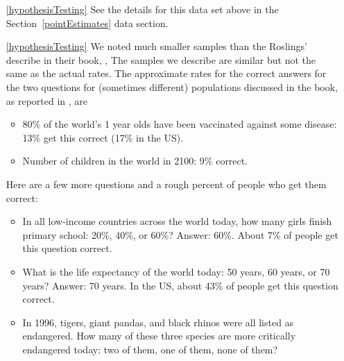 \begin{itemize}
\item[\ref{hypothesisTesting}]
    See the details for this data set above
    in the Section~\ref{pointEstimates} data section.
\item[\ref{hypothesisTesting}]
    We noted much smaller samples than the Roslings'
    describe in their book,
    ,
    The samples we describe are similar but not
    the same as the actual rates.
    The approximate rates for the correct answers for the
    two questions for (sometimes different) populations
    discussed in the book, as reported in
    ,
    are
    \begin{itemize}
    \item
        80\% of the world's 1 year olds have been vaccinated
        against some disease:
        13\% get this correct (17\% in the US).
    \item
        Number of children in the world in 2100:
        9\% correct.
    \end{itemize}
    Here are a few more questions and a rough percent
    of people who get them correct:
    \begin{itemize}
    \item
        In all low-income countries across the world today,
        how many girls finish primary school: 20\%, 40\%, or 60\%?
        Answer: 60\%.
        About 7\% of people get this question correct.
    \item
        What is the life expectancy of the world today:
        50 years, 60 years, or 70 years?
        Answer: 70 years.
        In the US, about 43\% of people get this question correct.
    \item
        In 1996, tigers, giant pandas, and black rhinos
        were all listed as endangered.
        How many of these three species are more
        critically endangered today:
        two of them,
        one of them,
        none of them?

\end{itemize}
\end{itemize}
